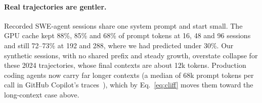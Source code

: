 \paragraph{Real trajectories are gentler.} Recorded SWE-agent sessions share one system prompt and start small. The GPU
cache kept 88\%, 85\% and 68\% of prompt tokens at 16, 48 and 96 sessions and still 72--73\% at 192 and 288, where we
had predicted under 30\%. Our synthetic sessions, with no shared prefix and steady growth, overstate collapse for these
2024 trajectories, whose final contexts are about 12k tokens. Production coding agents now carry far longer contexts
(a median of 68k prompt tokens per call in GitHub Copilot's traces~\cite{copilot2026wild}), which by Eq.~\eqref{eq:cliff} moves
them toward the long-context case above.
